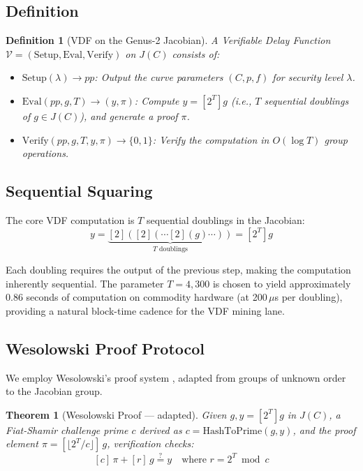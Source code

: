 \documentclass[11pt,a4paper]{article}
\newtheorem{theorem}{Theorem}[section]
\newtheorem{definition}{Definition}[section]
\begin{document}
\subsection{Definition}

\begin{definition}[VDF on the Genus-2 Jacobian]
\label{def:vdf}
A Verifiable Delay Function $\mathcal{V} = (\mathrm{Setup}, \mathrm{Eval}, \mathrm{Verify})$ on $J(C)$ consists of:
\begin{itemize}
    \item $\mathrm{Setup}(\lambda) \to \mathit{pp}$: Output the curve parameters $(C, p, f)$ for security level $\lambda$.
    \item $\mathrm{Eval}(\mathit{pp}, g, T) \to (y, \pi)$: Compute $y = [2^T]g$ (i.e., $T$ sequential doublings of $g \in J(C)$), and generate a proof $\pi$.
    \item $\mathrm{Verify}(\mathit{pp}, g, T, y, \pi) \to \{0, 1\}$: Verify the computation in $O(\log T)$ group operations.
\end{itemize}
\end{definition}

\subsection{Sequential Squaring}

The core VDF computation is $T$ sequential doublings in the Jacobian:
\begin{equation}
    y = \underbrace{[2]([2](\cdots [2](g) \cdots))}_{T \text{ doublings}} = [2^T] g
\end{equation}

Each doubling requires the output of the previous step, making the computation inherently sequential. The parameter $T = 4{,}300$ is chosen to yield approximately 0.86 seconds of computation on commodity hardware (at 200\,$\mu$s per doubling), providing a natural block-time cadence for the VDF mining lane.

\subsection{Wesolowski Proof Protocol}

We employ Wesolowski's proof system \cite{wesolowski2019}, adapted from groups of unknown order to the Jacobian group.

\begin{theorem}[Wesolowski Proof --- adapted]
\label{thm:wesolowski}
Given $g, y = [2^T]g$ in $J(C)$, a Fiat-Shamir challenge prime $c$ derived as $c = \mathrm{HashToPrime}(g, y)$, and the proof element $\pi = [\lfloor 2^T / c \rfloor]\, g$, verification checks:
\begin{equation}
\label{eq:verify}
    [c]\,\pi + [r]\,g \stackrel{?}{=} y \quad \text{where } r = 2^T \bmod c
\end{equation}
\end{theorem}
\end{document}
